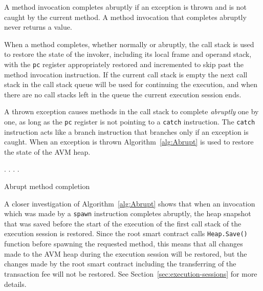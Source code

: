 \documentclass[11pt, a4paper]{report}
\begin{document}
    A method invocation completes abruptly if an exception is thrown and is not caught by the current method. A
    method invocation that completes abruptly never returns a value.

    When a method completes, whether normally or abruptly, the call stack is used to restore the state of the invoker,
    including its local frame and operand stack, with the \texttt{pc} register appropriately restored and incremented
    to skip past the method invocation instruction. If the current call stack is empty the next call stack in the call
    stack queue will be used for continuing the execution, and when there are no call stacks left in the queue the
    current execution session ends.

    A thrown exception causes methods in the call stack to complete \emph{abruptly} one by one, as long as the
    \texttt{pc} register is not pointing to a \texttt{catch} instruction. The \texttt{catch} instruction acts like a
    branch instruction that branches only if an exception is caught. When an exception is thrown
    Algorithm~\ref{alg:Abrupt} is used to restore the state of the AVM heap.

    \begin{algorithm}
        \DontPrintSemicolon

        {
            \Stack.\Pop{}\;
            {
                \Heap.\Restore{}\;
            }{
                \Heap.\Discard{}\;
            }
        }
        \Heap.\Restore{}\;
        \caption{Abrupt method completion}\label{alg:Abrupt}
    \end{algorithm}

    A closer investigation of Algorithm~\ref{alg:Abrupt} shows that when an invocation which was made by
    a \texttt{spawn} instruction completes abruptly, the heap snapshot that was saved before the start of the
    execution of the first call stack of the execution session is restored. Since the root
    smart contract calls \texttt{Heap.Save()} function before spawning the requested method, this means
    that all changes made to the AVM heap during the execution session will be restored, but the changes made by
    the root smart contract including the transferring of the transaction fee will not be restored. See
    Section~\ref{sec:execution-sessions} for more details.
\end{document}
